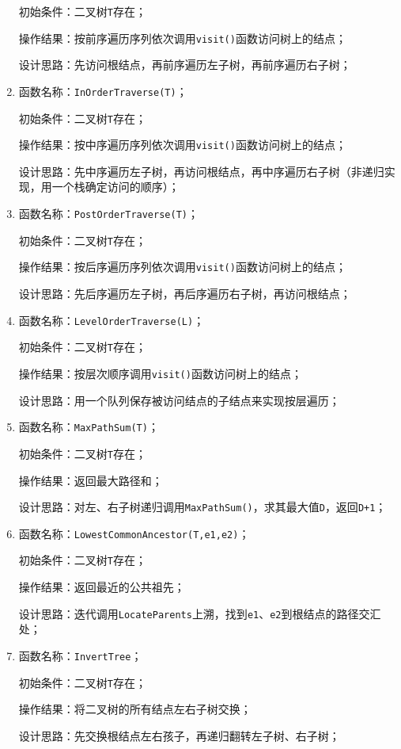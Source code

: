 \documentclass[supercite]{Experimental_Report}
\theoremstyle{definition}
\begin{document}
\begin{enumerate}
	初始条件：二叉树\verb|T|存在；

	操作结果：按前序遍历序列依次调用\verb|visit()|函数访问树上的结点；

	设计思路：先访问根结点，再前序遍历左子树，再前序遍历右子树；

	\item 函数名称：\verb|InOrderTraverse(T)|；
	
	初始条件：二叉树\verb|T|存在；

	操作结果：按中序遍历序列依次调用\verb|visit()|函数访问树上的结点；

	设计思路：先中序遍历左子树，再访问根结点，再中序遍历右子树（非递归实现，用一个栈确定访问的顺序）；

	\item 函数名称：\verb|PostOrderTraverse(T)|；
	
	初始条件：二叉树\verb|T|存在；

	操作结果：按后序遍历序列依次调用\verb|visit()|函数访问树上的结点；

	设计思路：先后序遍历左子树，再后序遍历右子树，再访问根结点；

	\item 函数名称：\verb|LevelOrderTraverse(L)|；

	初始条件：二叉树\verb|T|存在；

	操作结果：按层次顺序调用\verb|visit()|函数访问树上的结点；

	设计思路：用一个队列保存被访问结点的子结点来实现按层遍历；

	\item 函数名称：\verb|MaxPathSum(T)|；
	
	初始条件：二叉树\verb|T|存在；

	操作结果：返回最大路径和；

	设计思路：对左、右子树递归调用\verb|MaxPathSum()|，求其最大值\verb|D|，返回\verb|D+1|；

	\item 函数名称：\verb|LowestCommonAncestor(T,e1,e2)|；
	
	初始条件：二叉树\verb|T|存在；

	操作结果：返回最近的公共祖先；
	
	设计思路：迭代调用\verb|LocateParents|上溯，找到\verb|e1|、\verb|e2|到根结点的路径交汇处；

	\item 函数名称：\verb|InvertTree|；
	
	初始条件：二叉树\verb|T|存在；

	操作结果：将二叉树的所有结点左右子树交换；
	
	设计思路：先交换根结点左右孩子，再递归翻转左子树、右子树；
\end{enumerate}
\newpage
\end{document}
